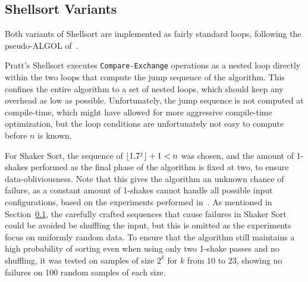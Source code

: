 \subsection{Shellsort Variants}
\label{sec:ShellsortImplementation}

Both variants of Shellsort are implemented as fairly standard loops, following the pseudo-ALGOL of~.

Pratt's Shellsort executes \texttt{Compare-Exchange} operations as a nested loop directly within the two loops that compute the jump sequence of the algorithm. This confines the entire algorithm to a set of nested loops, which should keep any overhead as low as possible. Unfortunately, the jump sequence is not computed at compile-time, which might have allowed for more aggressive compile-time optimization, but the loop conditions are unfortunately not easy to compute before $n$ is known.

For Shaker Sort, the sequence of  $\lfloor1.7^j\rfloor+1 < n$ was chosen, and the amount of 1-shakes performed as the final phase of the algorithm is fixed at two, to ensure data-obliviousness. Note that this gives the algorithm an unknown chance of failure, as a constant amount of 1-shakes cannot handle all possible input configurations, based on the experiments performed in~. As mentioned in Section~\ref{sec:ShellsortImplementation}, the carefully crafted sequences that cause failures in Shaker Sort could be avoided be shuffling the input, but this is omitted as the experiments focus on uniformly random data. To ensure that the algorithm still maintains a high probability of sorting even when using only two 1-shake passes and no shuffling, it was tested on samples of size $2^k$ for $k$ from $10$ to $23$, showing no failures on 100 random samples of each size.

